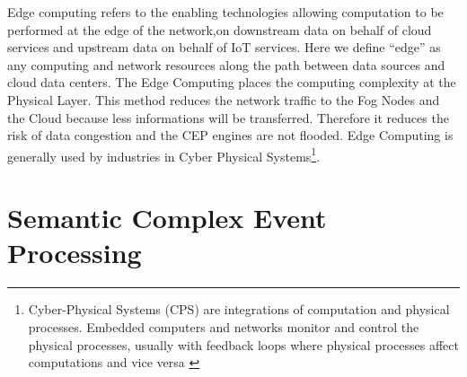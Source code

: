 \documentclass[11pt]{article}
\begin{document}
Edge computing refers to the enabling technologies allowing computation to be performed at the edge of the network,on downstream data on behalf of cloud services and upstream data on behalf of IoT services. Here we define “edge” as any computing and network resources along the path between data sources and cloud data centers.\cite{Edge Computing - Vision and Challenges}
\newline\newline
The Edge Computing places the computing complexity at the Physical Layer. This method reduces the network traffic to the Fog Nodes and the Cloud because less informations will be transferred. Therefore it reduces the risk of data congestion and the CEP engines are not flooded. Edge Computing is generally used by industries in Cyber Physical Systems\footnote{Cyber-Physical Systems (CPS) are integrations of computation and physical processes. Embedded computers and networks monitor and control the physical processes, usually with feedback loops where physical processes affect computations and vice versa \cite{5}}.


\section{Semantic Complex Event Processing}
\end{document}
